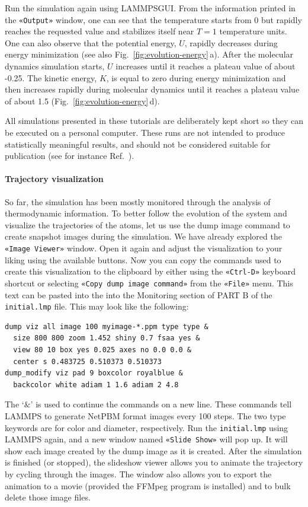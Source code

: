 \documentclass[9pt,tutorial]{livecoms}
\newcommand{\lmpcmd}[1]{\hspace{0pt}\colorbox{listing}{\textcolor{command}{\small{#1}}}\hspace{0pt}} %
\newcommand{\flecmd}[1]{\textcolor{command}{\texttt{#1}}} %
\newcommand{\guicmd}[1]{\textcolor{command}{\texttt{«#1»}}} %
\newcommand{\lammpsgui}{\textsf{LAMMPS\textendash GUI}}
\begin{document}
Run the simulation again using \lammpsgui{}.  From the information
printed in the \guicmd{Output} window, one can see that the temperature
starts from 0 but rapidly reaches the requested value and
stabilizes itself near $T=1$ temperature units.  One can also observe that
the potential energy, $U$, rapidly decreases during energy
minimization (see also Fig.~\ref{fig:evolution-energy}\,a).  After
the molecular dynamics simulation starts, $U$ increases until
it reaches a plateau value of about -0.25.  The kinetic energy,
$K$, is equal to zero during energy minimization and then
increases rapidly during molecular dynamics until it reaches
a plateau value of about 1.5 (Fig.~\ref{fig:evolution-energy}\,d).

\begin{note}
{\color{blue}All simulations presented in these tutorials are deliberately kept 
short so they can be executed on a personal computer.  These runs are not intended 
to produce statistically meaningful results, and should not be considered suitable 
for publication (see for instance Ref.~).}
\end{note}

\paragraph{Trajectory visualization}

So far, the simulation has been mostly monitored through the analysis of
thermodynamic information.  To better follow the evolution of the system
and visualize the trajectories of the atoms, let us use the \lmpcmd{dump
  image} command to create snapshot images during the simulation.  We
have already explored the \guicmd{Image Viewer} window.  Open it again
and adjust the visualization to your liking using the available buttons.
Now you can copy the commands used to create this visualization to the
clipboard by either using the \guicmd{Ctrl-D} keyboard shortcut or
selecting \guicmd{Copy dump image command} from the \guicmd{File} menu.
This text can be pasted into the into the \lmpcmd{Monitoring} section
of \lmpcmd{PART B} of the \flecmd{initial.lmp} file.  This may look like
the following:
\begin{lstlisting}
dump viz all image 100 myimage-*.ppm type type &
  size 800 800 zoom 1.452 shiny 0.7 fsaa yes &
  view 80 10 box yes 0.025 axes no 0.0 0.0 &
  center s 0.483725 0.510373 0.510373
dump_modify viz pad 9 boxcolor royalblue &
  backcolor white adiam 1 1.6 adiam 2 4.8
\end{lstlisting}
{\color{blue}The `$\&$' is used to continue the commands on a new line.
These commands tell} LAMMPS to generate NetPBM format images every 100
steps.  The two \lmpcmd{type} keywords are for \lmpcmd{color} and
\lmpcmd{diameter}, respectively.  Run the \flecmd{initial.lmp} using
LAMMPS again, and a new window named \guicmd{Slide Show} will pop up.
It will show each image created by the \lmpcmd{dump image} as it is
created. After the simulation is finished (or stopped), the slideshow
viewer allows you to animate the trajectory by cycling through the
images.  The window also allows you to export the animation to a movie
(provided the FFMpeg program is installed) and to bulk delete those
image files.
\end{document}
